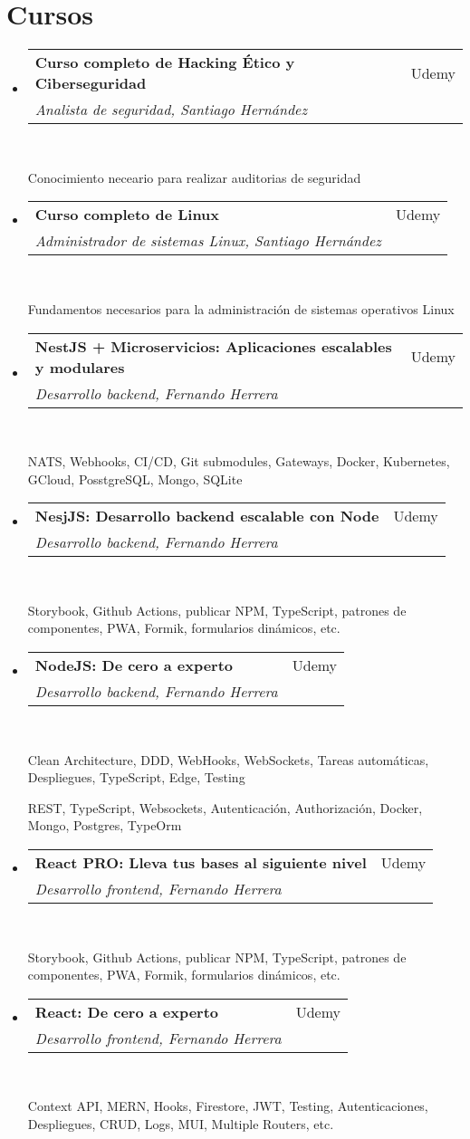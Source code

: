 \documentclass[letterpaper,11pt]{article}
\makeatletter
\newcommand{\resumeSubheading}[4]{
  \vspace{-2pt}\item
    \begin{tabular*}{0.97\textwidth}[t]{l@{\extracolsep{\fill}}r}
      \textbf{#1} & #2 \\
      \textit{\small#3} & \textit{\small #4} \\
    \end{tabular*}\vspace{-7pt}
}
\newcommand{\resumeSubHeadingListStart}{\begin{itemize}[leftmargin=0.15in, label={}]}
\newcommand{\resumeSubHeadingListEnd}{\end{itemize}}
\makeatother
\begin{document}
\section{Cursos}
  \resumeSubHeadingListStart

  \resumeSubheading
  {Curso completo de Hacking Ético y Ciberseguridad}{Udemy}
  {Analista de seguridad, Santiago Hernández}{}
  \
  \par{Conocimiento neceario para realizar auditorias de seguridad}
  \resumeSubheading
  {Curso completo de Linux}{Udemy}
  {Administrador de sistemas Linux, Santiago Hernández}{}
  \
  \par{Fundamentos necesarios para la administración de sistemas operativos Linux}
  \resumeSubheading
  {NestJS + Microservicios: Aplicaciones escalables y modulares}{Udemy}
  {Desarrollo backend, Fernando Herrera}{}
  \
  \par{NATS, Webhooks, CI/CD, Git submodules, Gateways, Docker, Kubernetes, GCloud, PosstgreSQL, Mongo, SQLite}
  \resumeSubheading
  {NesjJS: Desarrollo backend escalable con Node}{Udemy}
  {Desarrollo backend, Fernando Herrera}{}
  \
  \par{Storybook, Github Actions, publicar NPM, TypeScript, patrones de componentes, PWA, Formik, formularios dinámicos, etc. }
  \resumeSubheading
  {NodeJS: De cero a experto}{Udemy}
  {Desarrollo backend, Fernando Herrera}{}
  \
  \par{Clean Architecture, DDD, WebHooks, WebSockets, Tareas automáticas, Despliegues, TypeScript, Edge, Testing}

  \par{REST, TypeScript, Websockets, Autenticación, Authorización, Docker, Mongo, Postgres, TypeOrm}
  \resumeSubheading
  {React PRO: Lleva tus bases al siguiente nivel}{Udemy}
  {Desarrollo frontend, Fernando Herrera}{}
  \
  \par{Storybook, Github Actions, publicar NPM, TypeScript, patrones de componentes, PWA, Formik, formularios dinámicos, etc.}
  \resumeSubheading
  {React: De cero a experto}{Udemy}
  {Desarrollo frontend, Fernando Herrera}{}
  \
  \par{Context API, MERN, Hooks, Firestore, JWT, Testing, Autenticaciones, Despliegues, CRUD, Logs, MUI, Multiple Routers, etc.}

  \resumeSubHeadingListEnd

\end{document}
